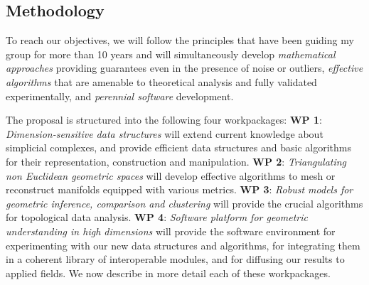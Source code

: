 



\subsection{Methodology}
To reach our objectives, we will follow the principles that have been guiding my group for more than 10 years and will simultaneously develop
{\em mathematical approaches} providing guarantees even in the presence of noise or outliers,
{\em effective algorithms} that are amenable to theoretical analysis and fully validated experimentally,
and {\em perennial software} development.

The proposal is structured into the following four workpackages:
{\bf WP 1}:  {\em Dimension-sensitive data  structures} will extend current knowledge about simplicial complexes, and  provide efficient data structures and basic algorithms for their representation, construction and manipulation. 
  {\bf WP 2}:  {\em Triangulating non Euclidean geometric spaces} will develop effective algorithms to mesh or reconstruct manifolds equipped with various metrics.   {\bf WP 3}: {\em Robust models for geometric inference, comparison and  clustering} will provide the crucial  algorithms for topological data analysis.
 {\bf WP 4}:  {\em  Software platform for geometric understanding in high dimensions} will provide the software environment for experimenting with our new data structures and algorithms, for integrating them in a coherent library of interoperable modules, and for diffusing our results to applied fields. We now describe in more detail each of these workpackages.


